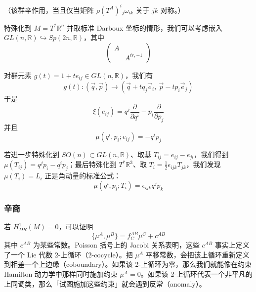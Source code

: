 （该群辛作用，当且仅当矩阵 $\rho(T^A)^i{}_j\omega_{ik}$ 关于 $jk$ 对称。）

特殊化到 $M=T^{*}\mathbb{R}^n$ 并取标准 Darboux 坐标的情形，我们可以考虑嵌入 $GL(n,\mathbb{R})\hookrightarrow Sp(2n,\mathbb{R})$，其中
\begin{equation}
  \begin{pmatrix}
    A & \\
      & A^{tr,-1}
  \end{pmatrix}
  \tag{A.21}
  \label{eq:A.21}
\end{equation}

对群元素 $g(t)=1+te_{ij}\in GL(n,\mathbb{R})$，我们有
\begin{equation}
  g(t):(\vec{q},\vec{p})\to(\vec{q}+tq_j\vec{e}_i,\ \vec{p}-tp_i\vec{e}_j)
  \tag{A.22}
  \label{eq:A.22}
\end{equation}
于是
\begin{equation}
  \xi(e_{ij})=q^j\frac{\partial}{\partial q^i}-p_i\frac{\partial}{\partial p_j}
  \tag{A.23}
  \label{eq:A.23}
\end{equation}
并且
\begin{equation}
  \mu(q^i,p_i;e_{ij})=-q^ip_j
  \tag{A.24}
  \label{eq:A.24}
\end{equation}

若进一步特殊化到 $SO(n)\subset GL(n,\mathbb{R})$、取基 $T_{ij}=e_{ij}-e_{ji}$，我们得到 $\mu(T_{ij})=q^jp_i-q^ip_j$；最后特殊化到 $T^{*}\mathbb{R}^3$、取 $T_i=\frac{1}{2}\epsilon_{ijk}T_{jk}$，我们发现 $\mu(T_i)=L_i$ 正是角动量的标准公式：
\begin{equation}
  \mu(q^i,p_i;T_i)=\epsilon_{ijk}q^jp_k
  \tag{A.25}
  \label{eq:A.25}
\end{equation}

\subsubsection{辛商} %

若 $H^{1}_{DR}(M)=0$，可以证明
\begin{equation}
  \{\mu^A,\mu^B\}=f_C^{AB}\mu^C+c^{AB}
  \tag{A.26}
  \label{eq:A.26}
\end{equation}
其中 $c^{AB}$ 为某些常数。Poisson 括号上的 Jacobi 关系表明，这些 $c^{AB}$ 事实上定义了一个 Lie 代数 2-上循环（2-cocycle）。把 $\mu^A$ 平移常数，会把该上循环重新定义到相差一个上边缘（coboundary）。如果该 2-上循环为零，那么我们就能像在约束 Hamilton 动力学中那样同时施加约束 $\mu^A=0$。如果该 2-上循环代表一个非平凡的上同调类，那么「试图施加这些约束」就会遇到反常（anomaly）。

